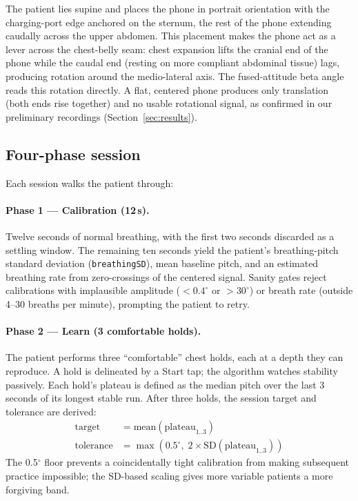 \documentclass[3p,times]{elsarticle}
\begin{document}
The patient lies supine and places the phone in portrait
orientation with the charging-port edge anchored on the sternum,
the rest of the phone extending caudally across the upper abdomen.
This placement makes the phone act as a lever across the
chest-belly seam: chest expansion lifts the cranial end of the
phone while the caudal end (resting on more compliant abdominal
tissue) lags, producing rotation around the medio-lateral axis.
The fused-attitude beta angle reads this rotation directly. A
flat, centered phone produces only translation (both ends rise
together) and no usable rotational signal, as confirmed in our
preliminary recordings (Section~\ref{sec:results}).

\subsection{Four-phase session}

Each session walks the patient through:

\paragraph{Phase 1 --- Calibration (12\,s).}
Twelve seconds of normal breathing, with the first two seconds
discarded as a settling window. The remaining ten seconds yield
the patient's breathing-pitch standard deviation
(\texttt{breathingSD}), mean baseline pitch, and an estimated
breathing rate from zero-crossings of the centered signal. Sanity
gates reject calibrations with implausible amplitude
($<\!0.4^{\circ}$ or $>\!30^{\circ}$) or breath rate (outside
4--30 breaths per minute), prompting the patient to retry.

\paragraph{Phase 2 --- Learn (3 comfortable holds).}
The patient performs three ``comfortable'' chest holds, each at a
depth they can reproduce. A hold is delineated by a Start tap; the
algorithm watches stability passively. Each hold's plateau is
defined as the median pitch over the last 3 seconds of its longest
stable run. After three holds, the session target and tolerance
are derived:
\begin{align}
\text{target} &= \text{mean}(\text{plateau}_{1..3}) \\
\text{tolerance} &= \max(0.5^{\circ},\; 2 \times \text{SD}(\text{plateau}_{1..3}))
\end{align}
The 0.5$^{\circ}$ floor prevents a coincidentally tight calibration
from making subsequent practice impossible; the SD-based scaling
gives more variable patients a more forgiving band.
\end{document}
